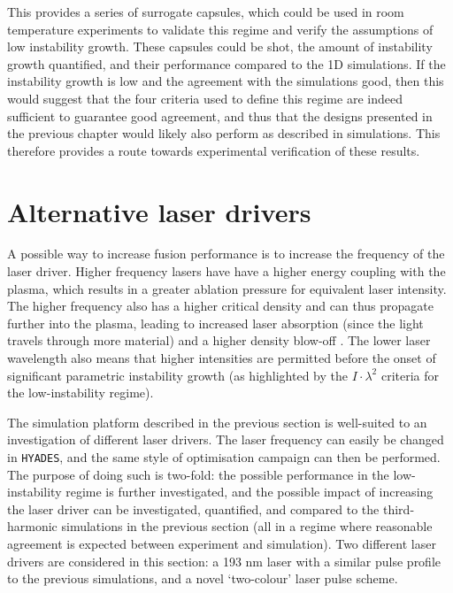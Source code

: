 This provides a series of surrogate capsules, which could be used in room temperature experiments to validate this regime and verify the assumptions of low instability growth. These capsules could be shot, the amount of instability growth quantified, and their performance compared to the 1D simulations. If the instability growth is low and the agreement with the simulations good, then this would suggest that the four criteria used to define this regime are indeed sufficient to guarantee good agreement, and thus that the designs presented in the previous chapter would likely also perform as described in simulations. This therefore provides a route towards experimental verification of these results.

\section{Alternative laser drivers} \label{sec:AlternativeDrivers}

A possible way to increase fusion performance is to increase the frequency of the laser driver. Higher frequency lasers have have a higher energy coupling with the plasma, which results in a greater ablation pressure for equivalent laser intensity. The higher frequency also has a higher critical density and can thus propagate further into the plasma, leading to increased laser absorption (since the light travels through more material) and a higher density blow-off \cite{Obenschain2020}. The lower laser wavelength also means that higher intensities are permitted before the onset of significant parametric instability growth \cite{Montgomery2016} (as highlighted by the $I \cdot \lambda^2$ criteria for the low-instability regime). 

The simulation platform described in the previous section is well-suited to an investigation of different laser drivers. The laser frequency can easily be changed in \texttt{HYADES}, and the same style of optimisation campaign can then be performed. The purpose of doing such is two-fold: the possible performance in the low-instability regime is further investigated, and the possible impact of increasing the laser driver can be investigated, quantified, and compared to the third-harmonic simulations in the previous section (all in a regime where reasonable agreement is expected between experiment and simulation). Two different laser drivers are considered in this section: a 193 \unit{\nano\meter} laser with a similar pulse profile to the previous simulations, and a novel `two-colour' laser pulse scheme.


